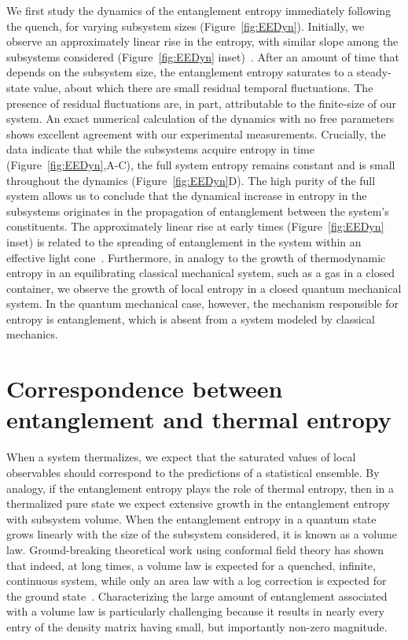 We first study the dynamics of the entanglement entropy immediately following the quench, for varying subsystem sizes (Figure~\ref{fig:EEDyn}). Initially, we observe an approximately linear rise in the entropy, with similar slope among the subsystems considered (Figure~\ref{fig:EEDyn} inset)~\cite{CardyOneD}. After an amount of time that depends on the subsystem size, the entanglement entropy saturates to a steady-state value, about which there are small residual temporal fluctuations. The presence of residual fluctuations are, in part, attributable to the finite-size of our system. An exact numerical calculation of the dynamics with no free parameters shows excellent agreement with our experimental measurements. Crucially, the data indicate that while the subsystems acquire entropy in time (Figure~\ref{fig:EEDyn},A-C), the full system entropy remains constant and is small throughout the dynamics (Figure~\ref{fig:EEDyn}D). The high purity of the full system allows us to conclude that the dynamical increase in entropy in the subsystems originates in the propagation of entanglement between the system's constituents. The approximately linear rise at early times (Figure~\ref{fig:EEDyn} inset) is related to the spreading of entanglement in the system within an effective light cone~\cite{CardyOneD,lightcone,Richerme2014}. Furthermore, in analogy to the growth of thermodynamic entropy in an equilibrating classical mechanical system, such as a gas in a closed container, we observe the growth of local entropy in a closed quantum mechanical system. In the quantum mechanical case, however, the mechanism responsible for entropy is entanglement, which is absent from a system modeled by classical mechanics.

\section{Correspondence between entanglement and thermal entropy}

When a system thermalizes, we expect that the saturated values of local observables should correspond to the predictions of a statistical ensemble. By analogy, if the entanglement entropy plays the role of thermal entropy, then in a thermalized pure state we expect extensive growth in the entanglement entropy with subsystem volume. When the entanglement entropy in a quantum state grows linearly with the size of the subsystem considered, it is known as a volume law. Ground-breaking theoretical work using conformal field theory has shown that indeed, at long times, a volume law is expected for a quenched, infinite, continuous system, while only an area law with a log correction is expected for the ground state~\cite{CardyGS, CardyOneD, Plenio2010}. Characterizing the large amount of entanglement associated with a volume law is particularly challenging because it results in nearly every entry of the density matrix having small, but importantly non-zero magnitude. 

